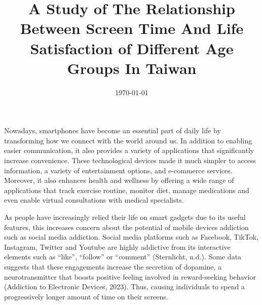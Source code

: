 \documentclass[12pt, a4paper]{article}
\title{\textbf{A Study of The Relationship Between Screen Time And Life Satisfaction of Different Age Groups In Taiwan}}
\author{{\small Fausto Urrutia (B11303091) \and \small Chintara Sahelangi (B12303097) \and \small Yanisa Saengcharoensuklert (B11303085)}}
\date{\today}
\begin{document}
\maketitle

\section*{}

\par {\Huge N}owadays, smartphones have become an essential part of daily life by transforming how we connect with the world around us. In addition to enabling easier communication, it also provides a variety of applications that significantly increase convenience. These technological devices made it much simpler to access information, a variety of entertainment options, and e-commerce services. Moreover, it also enhances health and wellness by offering a wide range of applications that track exercise routine, monitor diet, manage medications and even enable virtual consultations with medical specialists.
\par As people have increasingly relied their life on smart gadgets due to its useful features, this increases concern about the potential of mobile devices addiction such as social media addiction. Social media platforms such as Facebook, TikTok, Instagram, Twitter and Youtube are highly addictive from its interactive elements such as “like”, “follow” or “comment” (Sternlicht, n.d.). Some data suggests that these engagements increase the secretion of dopamine, a neurotransmitter that boosts positive feeling involved in reward-seeking behavior (Addiction to Electronic Devices, 2023). Thus, causing individuals to spend a progressively longer amount of time on their screens.
\end{document}
